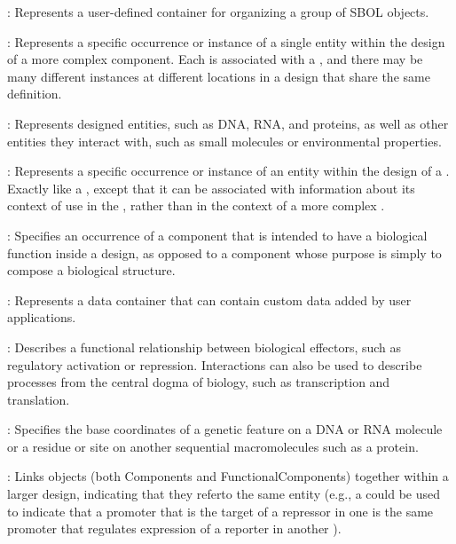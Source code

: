 \begin{description}

\item \emph{}:
Represents a user-defined container for organizing a group of SBOL objects.

\item \emph{}:
Represents a specific occurrence or instance of a single entity within the design of a more complex component.
Each  is associated with a , and there may be many different instances at different locations in a design that share the same definition.

\item \emph{}: Represents designed entities, such as DNA, RNA, and proteins, as well as other entities they interact with, such as small molecules or environmental properties.

\item \emph{}:
Represents a specific occurrence or instance of an entity within the design of a .
Exactly like a , except that it can be associated with information about its context of use in the , rather than in the context of a more complex .

\item \emph{}:
Specifies an occurrence of a component that is intended to have a biological function inside a design, as opposed to a component whose purpose is simply to compose a biological structure. 

\item \emph{}:
Represents a data container that can contain custom data added by user applications.

\item \emph{}:
Describes a functional relationship between biological effectors, such as regulatory activation or repression.  Interactions can also be used to describe processes from the central dogma of biology, such as transcription and translation.

\item \emph{}:
Specifies the base coordinates of a genetic feature on a DNA or RNA molecule or a residue or site on another sequential macromolecules such as a protein.

\item \emph{}:
Links  objects (both Components and FunctionalComponents) together within a larger design, indicating that they referto the same entity (e.g., a  could be used to indicate that a promoter that is the target of a repressor in one  is the same promoter that regulates expression of a reporter in another ).


\end{description}
